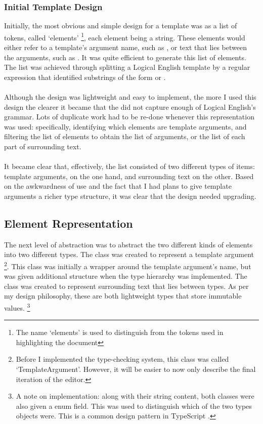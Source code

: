 \documentclass[../main.tex]{subfiles}
\begin{document}
\subsubsection{Initial Template Design}
Initially, the most obvious and simple design for a template was as a list of tokens, called `elements' \footnote{The name `elements' is used to distinguish from the tokens used in highlighting the document}, each element being a string. These elements would either refer to a template's argument name, such as , or text that lies between the arguments, such as . It was quite efficient to generate this list of elements. The list was achieved through splitting a Logical English template by a regular expression that identified substrings of the form  or . 
\\
\\
Although the design was lightweight and easy to implement, the more I used this design the clearer it became that the did not capture enough of Logical English's grammar. Lots of duplicate work had to be re-done whenever this representation was used: specifically, identifying which elements are template arguments, and filtering the list of elements to obtain the list of arguments, or the list of each part of surrounding text. 
\\ 
\\
It became clear that, effectively, the list consisted of two different types of items: template arguments, on the one hand, and surrounding text on the other. Based on the awkwardness of use and the fact that I had plans to give template arguments a richer type structure, it was clear that the design needed upgrading.

\subsection{Element Representation}
The next level of abstraction was to abstract the two different kinds of elements into two different types.
The class  was created to represent a template argument \footnote{Before I implemented the type-checking system, this class was called `TemplateArgument'. However, it will be easier to now only describe the final iteration of the editor.}. This  class was initially a wrapper around the template argument's name, but was given additional structure when the type hierarchy was implemented. The class  was created to represent surrounding text that lies between types. As per my design philosophy, these are both lightweight types that store immutable values. \footnote{A note on implementation: along with their string content, both classes were also given a  enum field. This was used to distinguish which of the two types  objects were. This is a common design pattern in TypeScript \cite{union_types}.}
\end{document}

